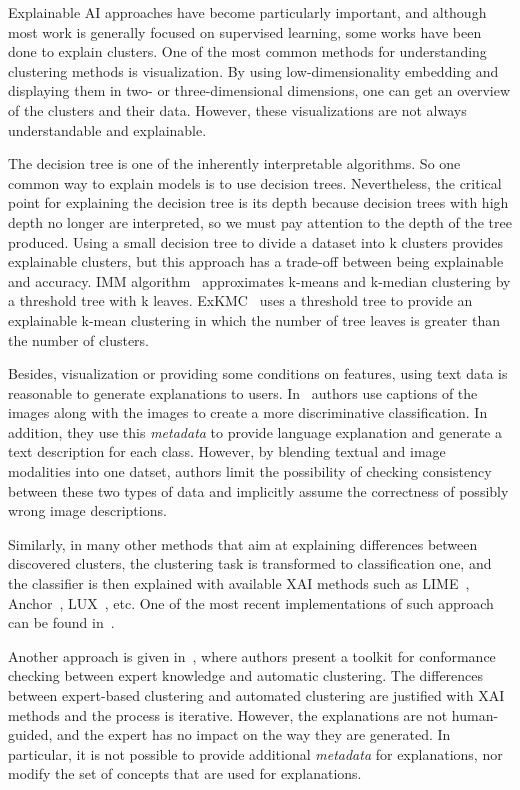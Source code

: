 \documentclass[
 twocolumn,
 hf,
]{ceurart}
\begin{document}
Explainable AI approaches have become particularly important, and although most work is generally focused on supervised learning, some works have been done to explain clusters.
One of the most common methods for understanding clustering methods is visualization. 
By using low-dimensionality embedding and displaying them in two- or three-dimensional dimensions, one can get an overview of the clusters and their data. 
However, these visualizations are not always understandable and explainable. 

The decision tree is one of the inherently interpretable algorithms. 
So one common way to explain models is to use decision trees. 
Nevertheless, the critical point for explaining the decision tree is its depth because decision trees with high depth no longer are interpreted, so we must pay attention to the depth of the tree produced. 
Using a small decision tree to divide a dataset into k clusters provides explainable clusters, but this approach has a trade-off between being explainable and accuracy. 
IMM algorithm~\cite{dasgupta2020explainable} approximates k-means and k-median clustering by a threshold tree with k leaves.
ExKMC~\cite{frost2020exkmc} uses a threshold tree to provide an explainable k-mean clustering in which the number of tree leaves is greater than the number of clusters.

Besides, visualization or providing some conditions on features, using text data is reasonable to generate explanations to users.
In~\cite{hendricks2016generating} authors use captions of the images along with the images to create a more discriminative classification. 
In addition, they use this \textit{metadata} to provide language explanation and generate a text description for each class.
However, by blending textual and image modalities into one datset, authors limit the possibility of checking consistency between these two types of data and implicitly assume the correctness of possibly wrong image descriptions.

Similarly, in many other methods that aim at explaining differences between discovered clusters, the clustering task is transformed to classification one, and the classifier is then explained with available XAI methods such as LIME~\cite{lime}, Anchor~\cite{anchor}, LUX~\cite{lux2021iccs}, etc.
One of the most recent implementations of such approach can be found in~\cite{xaiclust2021}.

Another approach is given in~\cite{knac2021arxiv}, where authors present a toolkit for conformance checking between expert knowledge and automatic clustering.
The differences between expert-based clustering and automated clustering are justified with XAI methods and the process is iterative.
However, the explanations are not human-guided, and the expert has no impact on the way they are generated.
In particular, it is not possible to provide additional \textit{metadata} for explanations, nor modify the set of concepts that are used for explanations.
\end{document}
